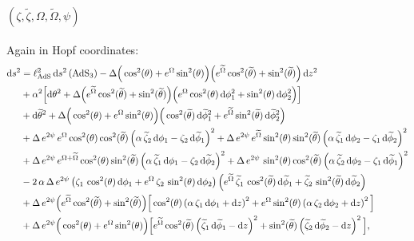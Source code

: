 \documentclass[a4paper, 11pt]{article}
\numberwithin{equation}{section}
\newcommand{\ts}[1]{\widetilde{#1}}
\newcommand{\+}{\oplus}
\renewcommand{\d}{\ensuremath{\mathrm{d}}\xspace}
\begin{document}
\paragraph{\boldmath $(\zeta,\ts{\zeta},\Omega,\ts{\Omega},\psi)$}
Again in Hopf coordinates:
\begin{equation}
	\begin{split}
		\d s^{2} &= \ell_{\rm AdS}^{2}\,\d s^{2}\left({\rm AdS}_{3}\right) -\Delta\Big(\cos^{2}(\theta)+e^{\Omega}\sin^{2}(\theta)\Big)\Big(e^{\ts{\Omega}}\cos^{2}(\ts{\theta})+\sin^{2}(\ts{\theta})\Big)\,\d z^{2}\\
		&+ \alpha^{2}\Big[\d\theta^{2} + \Delta\Big(e^{\ts{\Omega}}\cos^{2}(\ts{\theta})+\sin^{2}(\ts{\theta})\Big)\Big(e^{\Omega}\cos^{2}(\theta)\,\d\phi_{1}^{2}+\sin^{2}(\theta)\,\d\phi_{2}^{2}\Big)\Big]\\
		&+\d\ts{\theta}^{2} + \Delta\Big(\cos^{2}(\theta)+e^{\Omega}\sin^{2}(\theta)\Big)\Big(\cos^{2}(\ts{\theta})\,\d\ts{\phi}_{1}^{2}+e^{\ts{\Omega}}\sin^{2}(\ts{\theta})\,\d\ts{\phi}_{2}^{2}\Big)\\
		&+\Delta\,e^{2\psi}\,e^{\Omega}\cos^{2}(\theta)\cos^{2}(\ts{\theta}) \left(\alpha\,\ts{\zeta}_{2}\,\d\phi_{1}-\zeta_{2}\,\d\ts{\phi}_{1}\right)^{2}+\Delta\,e^{2\psi}\,e^{\ts{\Omega}}\sin^{2}(\theta)\sin^{2}(\ts{\theta}) \left(\alpha\,\ts{\zeta}_{1}\,\d\phi_{2}-\zeta_{1}\,\d\ts{\phi}_{2}\right)^{2}\\
		&+\Delta\,e^{2\psi}\,e^{\Omega+\ts{\Omega}}\cos^{2}(\theta)\sin^{2}(\ts{\theta}) \left(\alpha\,\ts{\zeta}_{1}\,\d\phi_{1}-\zeta_{2}\,\d\ts{\phi}_{2}\right)^{2}+\Delta\,e^{2\psi}\,\sin^{2}(\theta)\cos^{2}(\ts{\theta}) \left(\alpha\,\ts{\zeta}_{2}\,\d\phi_{2}-\zeta_{1}\,\d\ts{\phi}_{1}\right)^{2}\\
		&-2\,\alpha\,\Delta\,e^{2\psi}\left(\zeta_{1}\,\cos^{2}(\theta)\,\d\phi_{1}+e^{\Omega}\,\zeta_{2}\,\sin^{2}(\theta)\,\d\phi_{2}\right)\left(e^{\ts{\Omega}}\,\ts{\zeta}_{1}\,\cos^{2}(\ts{\theta})\,\d\ts{\phi}_{1}+\ts{\zeta}_{2}\,\sin^{2}(\ts{\theta})\,\d\ts{\phi}_{2}\right)\\
		&+\Delta\,e^{2\psi}\Big(e^{\ts{\Omega}}\cos^{2}(\ts{\theta})+\sin^{2}(\ts{\theta})\Big)\Big[\cos^{2}(\theta)\left(\alpha\,\zeta_{1}\,\d\phi_{1}+\d z\right)^{2}+e^{\Omega}\sin^{2}(\theta)\left(\alpha\,\zeta_{2}\,\d\phi_{2}+\d z\right)^{2}\Big]\\
		&+\Delta\,e^{2\psi}\Big(\cos^{2}(\theta)+e^{\Omega}\sin^{2}(\theta)\Big)\Big[e^{\ts{\Omega}}\cos^{2}(\ts{\theta})\left(\ts{\zeta}_{1}\,\d\ts{\phi}_{1}-\d z\right)^{2}+\sin^{2}(\ts{\theta})\left(\ts{\zeta}_{2}\,\d\ts{\phi}_{2}-\d z\right)^{2}\Big],
	\end{split}
\end{equation}
\end{document}
